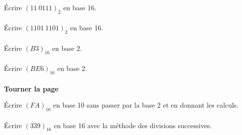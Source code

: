 \documentclass[a4paper,12pt,eval,firamath]{nsi}
\begin{document}
\maketitle

\'Ecrire $(11\ 0111)_2$ en base 16.\\

\\

\'Ecrire $(1101\ 1101)_2$ en base 16.\\

\\

\'Ecrire $(B3)_{16}$ en base 2.\\

\\

\'Ecrire $(BE6)_{16}$ en base 2.\\

\\

{\hfill\textbf{Tourner la page}}

\newpage

\'Ecrire $(FA)_{16}$ en base 10 sans passer par la base 2 et en donnant les calculs.\\

\\

\'Ecrire $(339)_{16}$ en base 16 avec la méthode des divisions successives.\\

\end{document}
